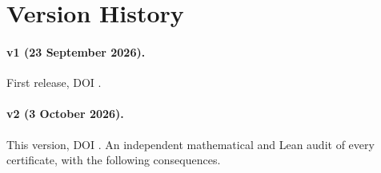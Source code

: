 \section{Version History}
\label{app:versions}

\paragraph{v1 (23 September 2026).} First release, DOI \href{https://doi.org/\paperfirstdoi}{\paperfirstdoi}.

\paragraph{v2 (3 October 2026).} This version, DOI \href{https://doi.org/\paperdoi}{\paperdoi}. An independent mathematical and Lean audit of every certificate,
with the following consequences.
